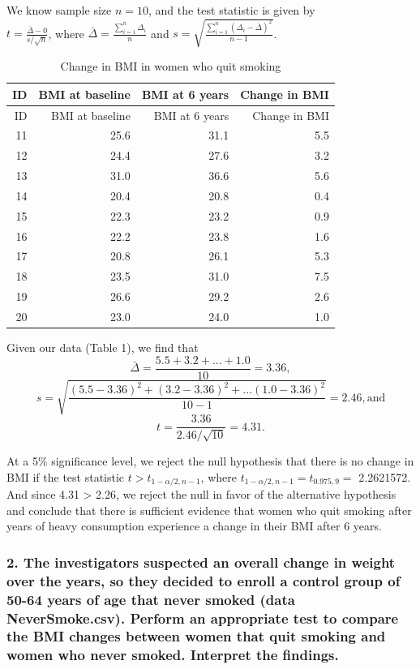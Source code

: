 \documentclass[]{article}
\begin{document}
We know sample size \(n = 10\), and the test statistic is given by\\
\(t = \frac{\bar{\Delta} - 0}{s/\sqrt{n}}\), where
\(\bar{\Delta} = \frac{\sum_{i=1}^n {\Delta_i}}{n}\) and
\(s = \sqrt{\frac{\sum_{i=1}^n{(\Delta_i - \bar{\Delta})^2}}{n - 1}}\).

\begin{longtable}[]{@{}rrrr@{}}
\caption{Change in BMI in women who quit smoking}\tabularnewline
\toprule
ID & BMI at baseline & BMI at 6 years & Change in BMI\tabularnewline
\midrule
\endfirsthead
\toprule
ID & BMI at baseline & BMI at 6 years & Change in BMI\tabularnewline
\midrule
\endhead
11 & 25.6 & 31.1 & 5.5\tabularnewline
12 & 24.4 & 27.6 & 3.2\tabularnewline
13 & 31.0 & 36.6 & 5.6\tabularnewline
14 & 20.4 & 20.8 & 0.4\tabularnewline
15 & 22.3 & 23.2 & 0.9\tabularnewline
16 & 22.2 & 23.8 & 1.6\tabularnewline
17 & 20.8 & 26.1 & 5.3\tabularnewline
18 & 23.5 & 31.0 & 7.5\tabularnewline
19 & 26.6 & 29.2 & 2.6\tabularnewline
20 & 23.0 & 24.0 & 1.0\tabularnewline
\bottomrule
\end{longtable}

Given our data (Table 1), we find that
\[\bar{\Delta} = \frac{5.5 + 3.2 + ... + 1.0}{10} = 3.36,\]
\[s = \sqrt{\frac{(5.5-3.36)^2 + (3.2-3.36)^2 + ... (1.0-3.36)^2}{10-1}} = 2.46, \text{and}\]
\[t = \frac{3.36}{2.46/\sqrt{10}} = 4.31.\]

At a 5\% significance level, we reject the null hypothesis that there is
no change in BMI if the test statistic \(t > t_{1-\alpha/2, n-1}\),
where \(t_{1-\alpha/2, n-1} = t_{0.975, 9} =\) 2.2621572. And since 4.31
\textgreater{} 2.26, we reject the null in favor of the alternative
hypothesis and conclude that there is sufficient evidence that women who
quit smoking after years of heavy consumption experience a change in
their BMI after 6 years.

\subsubsection{2. The investigators suspected an overall change in
weight over the years, so they decided to enroll a control group of
50-64 years of age that never smoked (data NeverSmoke.csv). Perform an
appropriate test to compare the BMI changes between women that quit
smoking and women who never smoked. Interpret the
findings.}\label{the-investigators-suspected-an-overall-change-in-weight-over-the-years-so-they-decided-to-enroll-a-control-group-of-50-64-years-of-age-that-never-smoked-data-neversmoke.csv.-perform-an-appropriate-test-to-compare-the-bmi-changes-between-women-that-quit-smoking-and-women-who-never-smoked.-interpret-the-findings.}
\end{document}
